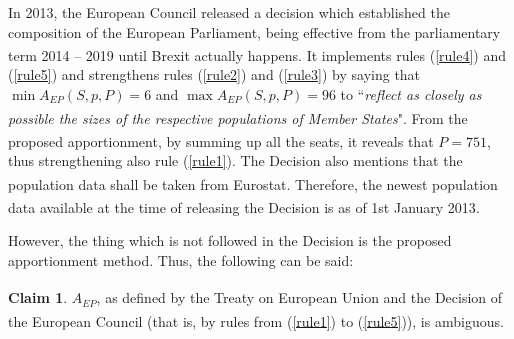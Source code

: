 \documentclass[a4paper]{article}
\theoremstyle{definition}
\newtheorem{claim}[definition]{Claim}
\begin{document}
In 2013, the European Council released a decision which established the composition of the European Parliament, being effective from  the parliamentary term 2014 -- 2019 until Brexit actually happens.\textsuperscript{\cite{ec2013}} It implements rules (\ref{rule4}) and (\ref{rule5}) and strengthens rules (\ref{rule2}) and (\ref{rule3}) by saying that $\min A_{EP}(S, p, P) = 6$ and $\max A_{EP}(S, p, P) = 96$ to ``\textit{reflect  as  closely  as  possible  the  sizes  of  the  respective  populations  of  Member  States}"\textsuperscript{\cite[Art.~1]{ec2013}}. From the proposed apportionment\textsuperscript{\cite[Art.~3]{ec2013}}, by summing up all the seats, it reveals that $P = 751$, thus strengthening also rule (\ref{rule1}). The Decision also mentions that the population data shall be taken from Eurostat\textsuperscript{\cite[Art.~2]{ec2013}}. Therefore, the newest population data available at the time of releasing the Decision is as of 1st January 2013\textsuperscript{\cite{eurostat}}.

However, the thing which is not followed in the Decision is the proposed apportionment method. Thus, the following can be said:

\begin{claim}
	$A_{EP}$, as defined by the Treaty on European Union\textsuperscript{\cite{eutreaty}} and the Decision of the European Council\textsuperscript{\cite{ec2013}} (that is, by rules from (\ref{rule1}) to (\ref{rule5})), is ambiguous.
\end{claim}
\end{document}
